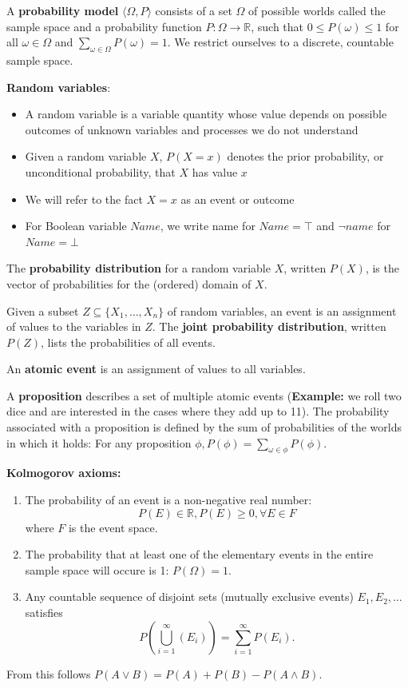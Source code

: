 \documentclass{scrartcl}
\begin{document}
A \textbf{probability model} \(\langle \Omega, P \rangle\) consists of a set \(\Omega\) of possible worlds called the sample space and a probability function \(P: \Omega \rightarrow \mathbb{R}\), such that \(0 \leq P(\omega) \leq 1\) for all \(\omega \in \Omega\) and \(\sum_{\omega \in \Omega} P(\omega) = 1\). We restrict ourselves to a discrete, countable sample space.

\textbf{Random variables}:
\begin{itemize}
    \item
        A random variable is a variable quantity whose value depends on possible outcomes of unknown variables and processes we do not understand
    \item
        Given a random variable \(X\), \(P(X = x)\) denotes the prior probability, or unconditional probability, that \(X\) has value \(x\)
    \item
        We will refer to the fact \(X = x\) as an event or outcome
    \item
        For Boolean variable \(Name\), we write name for \(Name = \top\) and \(\lnot name\) for \(Name = \bot\)
\end{itemize}

The \textbf{probability distribution} for a random variable \(X\), written \(P(X)\), is the vector of probabilities for the (ordered) domain of \(X\).

Given a subset \(Z \subseteq \{X_1, \dots, X_n\}\) of random variables, an event is an assignment of values to the variables in \(Z\). The \textbf{joint probability distribution}, written \(P(Z)\), lists the probabilities of all events.

An \textbf{atomic event} is an assignment of values to all variables.

A \textbf{proposition} describes a set of multiple atomic events (\textbf{Example:} we roll two dice and are interested in the cases where they add up to 11). The probability associated with a proposition is defined by the sum of probabilities of the worlds in which it holds: For any proposition \(\phi, P(\phi) = \sum_{\omega \in \phi} P(\phi)\).

\textbf{Kolmogorov axioms:}
\begin{enumerate}
    \item
        The probability of an event is a non-negative real number: \[P(E) \in \mathbb{R}, P(E) \geq 0, \forall E \in F\] where \(F\) is the event space.
    \item
        The probability that at least one of the elementary events in the entire sample space will occure is 1: \(P(\Omega) = 1\).
    \item
        Any countable sequence of disjoint sets (mutually exclusive events) \(E_1, E_2, \dots \) satisfies \[P(\bigcup_{i=1}^{\infty} (E_i)) = \sum_{i=1}^{\infty} P(E_i).\]
\end{enumerate}
From this follows \(P(A \lor B) = P(A) + P(B) - P(A \land B)\).
\end{document}
